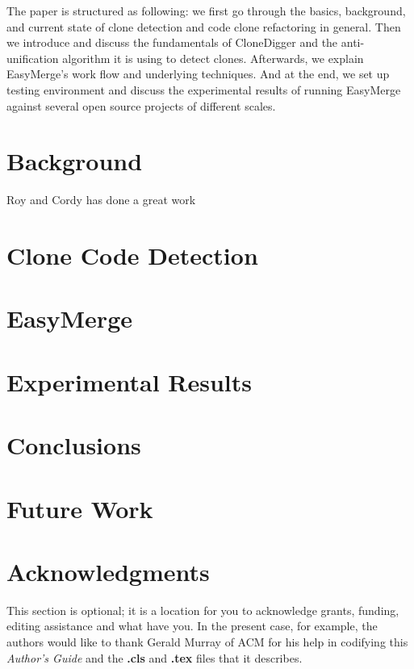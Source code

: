 \documentclass{acm_proc_article-sp}
\begin{document}
The paper is structured as following: we first go through the basics, background, and current state of clone detection and code clone refactoring in general.
Then we introduce and discuss the fundamentals of CloneDigger and the anti-unification algorithm it is using to detect clones. Afterwards, we explain EasyMerge's
work flow and underlying techniques. And at the end, we set up testing environment and discuss the experimental results of running EasyMerge against several
open source projects of different scales.

\section{Background}
Roy and Cordy has done a great work \cite{roy2}

\section{Clone Code Detection}

\section{EasyMerge}

\section{Experimental Results}

\section{Conclusions}

\section{Future Work}

\section{Acknowledgments}
This section is optional; it is a location for you
to acknowledge grants, funding, editing assistance and
what have you.  In the present case, for example, the
authors would like to thank Gerald Murray of ACM for
his help in codifying this \textit{Author's Guide}
and the \textbf{.cls} and \textbf{.tex} files that it describes.
\end{document}
